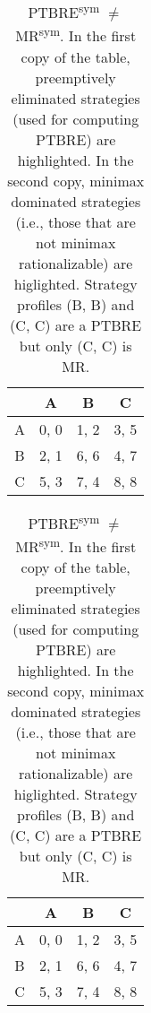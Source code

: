 \begin{table}
	\caption{
		PTBRE\textsuperscript{sym} $\ne$ MR\textsuperscript{sym}.
		In the first copy of the table, preemptively eliminated strategies (used for computing PTBRE) are highlighted.
		In the second copy, minimax dominated strategies (i.e., those that are not minimax rationalizable) are higlighted.
		Strategy profiles (B, B) and (C, C) are a PTBRE but only (C, C) is MR.
	}
	\label{tab:sym-ptbre-ne-mr}
	\centering
	\begin{tabular}{|c|c|c|c|}
		\hline
			& A		& B	   & C	  \\
		\hline
		A 		&\cellcolor{gray!70} 0, 0 &\cellcolor{gray!70} 1, 2 &\cellcolor{gray!70} 3, 5 \\
		\hline
		B		&\cellcolor{gray!70} 2, 1 &\cellcolor{gray!20} 6, 6 &\cellcolor{gray!70} 4, 7 \\
		\hline
		C		&\cellcolor{gray!70} 5, 3 &\cellcolor{gray!70} 7, 4 &\cellcolor{gray!00} 8, 8 \\
		\hline
	\end{tabular}
	\hspace{1em}
	\begin{tabular}{|c|c|c|c|}
		\hline
			& A		& B	   & C	  \\
		\hline
		A 		&\cellcolor{gray!70} 0, 0 &\cellcolor{gray!70} 1, 2 &\cellcolor{gray!70} 3, 5 \\
		\hline
		B		&\cellcolor{gray!70} 2, 1 &\cellcolor{gray!20} 6, 6 &\cellcolor{gray!20} 4, 7 \\
		\hline
		C		&\cellcolor{gray!70} 5, 3 &\cellcolor{gray!20} 7, 4 &\cellcolor{gray!00} 8, 8 \\
		\hline
	\end{tabular}
\end{table}

